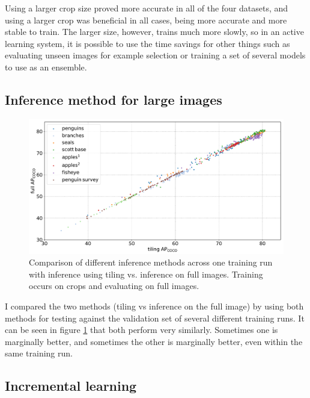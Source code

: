 Using a larger crop size proved more accurate in all of the four datasets, and using a larger crop was beneficial in all cases, being more accurate and more stable to train. The larger size, however, trains much more slowly, so in an active learning system, it is possible to use the time savings for other things such as evaluating unseen images for example selection or training a set of several models to use as an ensemble.


\subsection {Inference method for large images}

\begin{figure}[htb] 
  \centering
  \includegraphics[width=1.0\linewidth]{charts/training/splits_scatters.pdf}
  \caption{Comparison of different inference methods across one training run with inference using tiling vs. inference on full images. Training occurs on crops and evaluating on full images. }   
  \label{fig:inference_method}
\end{figure}


I compared the two methods (tiling vs inference on the full image) by using both methods for testing against the validation set of several different training runs. It can be seen in figure \ref{fig:inference_method} that both perform very similarly. Sometimes one is marginally better, and sometimes the other is marginally better, even within the same training run.

\subsection{Incremental learning}
\label{sec:incremental_learning}

